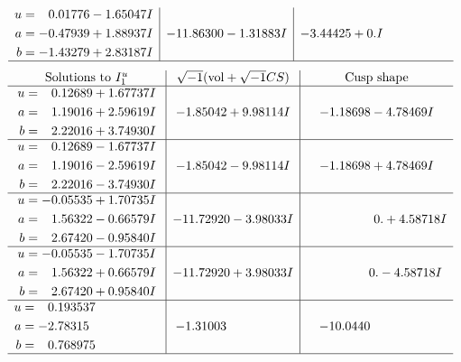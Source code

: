 \documentclass[1p]{elsarticle_modified}
\theoremstyle{definition}
\newcommand{\I}{\sqrt{-1}}
\begin{document}
$$\begin{array}{c|c|c}
\begin{aligned}
u &= \phantom{-}0.01776 - 1.65047 I \\
a &= -0.47939 + 1.88937 I \\
b &= -1.43279 + 2.83187 I\end{aligned}
 & -11.86300 - 1.31883 I & -3.44425 + 0. I\phantom{ +0.000000I}\\
 \hline 
 \end{array}$$\newpage$$\begin{array}{c|c|c}  
\text{Solutions to }I^u_{1}& \I (\text{vol} + \sqrt{-1}CS) & \text{Cusp shape}\\
 \hline 
\begin{aligned}
u &= \phantom{-}0.12689 + 1.67737 I \\
a &= \phantom{-}1.19016 + 2.59619 I \\
b &= \phantom{-}2.22016 + 3.74930 I\end{aligned}
 & -1.85042 + 9.98114 I & -1.18698 - 4.78469 I \\ \hline\begin{aligned}
u &= \phantom{-}0.12689 - 1.67737 I \\
a &= \phantom{-}1.19016 - 2.59619 I \\
b &= \phantom{-}2.22016 - 3.74930 I\end{aligned}
 & -1.85042 - 9.98114 I & -1.18698 + 4.78469 I \\ \hline\begin{aligned}
u &= -0.05535 + 1.70735 I \\
a &= \phantom{-}1.56322 - 0.66579 I \\
b &= \phantom{-}2.67420 - 0.95840 I\end{aligned}
 & -11.72920 - 3.98033 I & \phantom{-0.000000 -}0. + 4.58718 I \\ \hline\begin{aligned}
u &= -0.05535 - 1.70735 I \\
a &= \phantom{-}1.56322 + 0.66579 I \\
b &= \phantom{-}2.67420 + 0.95840 I\end{aligned}
 & -11.72920 + 3.98033 I & \phantom{-0.000000 } 0. - 4.58718 I \\ \hline\begin{aligned}
u &= \phantom{-}0.193537\phantom{ +0.000000I} \\
a &= -2.78315\phantom{ +0.000000I} \\
b &= \phantom{-}0.768975\phantom{ +0.000000I}\end{aligned}
 & -1.31003\phantom{ +0.000000I} & -10.0440\phantom{ +0.000000I}\\
 \hline 
 \end{array}$$\newpage\newpage\renewcommand{\arraystretch}{1}
\end{document}
